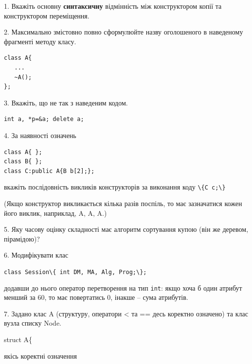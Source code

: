 \documentclass[12pt, ukrainian]{article}
\def\code#1{\Verb!#1!}
\begin{document}
{%
1. Вкажіть основну \textbf{синтаксичну} відмінність між конструктором копії та конструктором переміщення.%
\par
\vspace{2mm}
2. Максимально змістовно повно сформулюйте назву оголошеного в наведеному фрагменті методу класу.
\vspace{-3mm}
\begin{verbatim}class A{
   ...
   ~A();
};\end{verbatim}
\vspace{-3mm}
\par
\vspace{2mm}
3. Вкажіть, що не так з наведеним кодом.
\vspace{-3mm}
\begin{verbatim}int a, *p=&a; delete a;\end{verbatim}
\vspace{-3mm}
\par
\vspace{2mm}
4. За наявності означень
\vspace{-3mm}
\begin{verbatim}
class A{ };
class B{ };
class C:public A{B b[2];};\end{verbatim}
\vspace{-3mm}
вкажіть послідовність викликів конструкторів за виконання коду \code{\{C c;\}} 

(Якщо конструктор викликається кілька разів поспіль, то має зазначатися кожен його виклик, наприклад, A, A, A.)

\vspace{2mm}
5. Яку часову оцінку складності має алгоритм сортування купою (він же деревом, пірамідою)?
\par
\vspace{2mm}
6. Модифікувати клас 

\qquad\code{class Session\{ int DM, MA, Alg, Prog;\};} 


додавши до нього оператор перетворення на тип \code{int}: якщо хоча б один атрибут менший за 60, то має повертатись 0, інакше -- сума атрибутів.%
\par
\vspace{2mm}
7. 
Задано клас A (структуру, оператори < та == десь коректно означено) та клас вузла списку Node.

struct A\{

\quad  якісь коректні означення 

}
\end{document}
